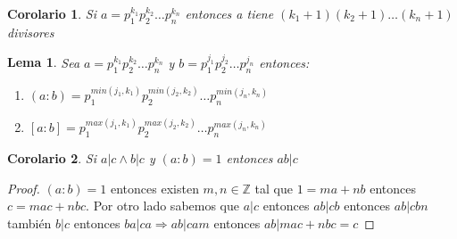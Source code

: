 \documentclass{article}
\theoremstyle{break}
\newtheorem{corollary}{Corolario}[theorem]
\newtheorem{lemma}[theorem]{Lema}
\def \Z{\mathbb{Z}}
\begin{document}
    \begin{corollary}
        Si $a = p_1^{k_1}p_2^{k_2}\ldots p_n^{k_n}$ entonces a tiene $(k_1 + 1)(k_2 + 1)\ldots(k_n+1)$ divisores
    \end{corollary}

    \begin{lemma}
        Sea $a = p_1^{k_1}p_2^{k_2}\ldots p_n^{k_n}$ y $b = p_1^{j_1}p_2^{j_2}\ldots p_n^{j_n}$ entonces:
        \begin{enumerate}
            \item $(a:b) = p_1^{min(j_1,k_1)}p_2^{min(j_2,k_2)}\ldots p_n^{min(j_n,k_n)} $
            \item $[a:b] = p_1^{max(j_1,k_1)}p_2^{max(j_2,k_2)}\ldots p_n^{max(j_n,k_n)} $
        \end{enumerate}
    \end{lemma}

    \begin{corollary}
        Si $a|c \land b|c$ y $(a:b)=1$ entonces $ab|c$
    \end{corollary}

    \begin{proof}
        $(a:b) = 1 $ entonces existen $m,n\in\Z$ tal que $1 = ma + nb$ entonces $c = mac + nbc$. Por otro lado sabemos que $a|c$ entonces 
        $ab|cb$ entonces $ab|cbn$ también $b|c$ entonces $ba|ca \Rightarrow  ab|cam$ entonces $ab|mac + nbc = c$
    \end{proof}
\end{document}
